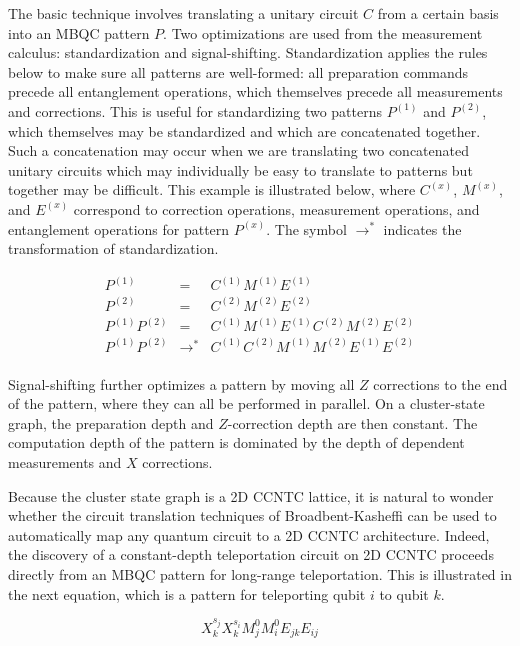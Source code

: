 \begin{description}
The basic
technique involves translating a unitary circuit $C$ from a certain basis
into an MBQC pattern $P$. Two optimizations are used from the measurement
calculus: standardization and signal-shifting. Standardization applies
the rules below to make sure all patterns are well-formed: all
preparation commands precede all entanglement operations, which themselves
precede all measurements and corrections. This is useful for
standardizing two patterns $P^(1)$ and $P^(2)$, which themselves may be
standardized and which are concatenated together. Such a concatenation
may occur when we are translating two concatenated unitary circuits
which may individually be easy to translate to patterns but together may
be difficult. This example is illustrated below, where $C^{(x)}$,
$M^{(x)}$, and $E^{(x)}$ correspond to correction operations, measurement
operations, and entanglement operations for pattern $P^{(x)}$.
The symbol $\rightarrow^{*}$ indicates the transformation of standardization.

\begin{eqnarray}
P^{(1)} & = & C^{(1)}M^{(1)}E^{(1)} \\
P^{(2)} & = & C^{(2)}M^{(2)}E^{(2)} \\
P^{(1)}P^{(2)} & = & C^{(1)}M^{(1)}E^{(1)}C^{(2)}M^{(2)}E^{(2)} \\
P^{(1)}P^{(2)} & \rightarrow^{*} & C^{(1)}C^{(2)}M^{(1)}M^{(2)}E^{(1)}E^{(2)} \\
\end{eqnarray}

Signal-shifting further optimizes a pattern by moving all $Z$ corrections to
the end of the pattern, where they can all be performed in parallel. On a
cluster-state graph, the preparation depth and $Z$-correction depth are then
constant. The computation depth of the pattern is dominated by the
depth of dependent measurements and $X$ corrections.

Because the cluster state graph is a 2D CCNTC lattice, it is natural to
wonder whether the circuit translation techniques of Broadbent-Kasheffi
can be used to automatically map any quantum circuit to a 2D CCNTC
architecture. Indeed, the discovery of a constant-depth teleportation
circuit on \textsf{2D CCNTC} proceeds directly from an MBQC pattern
for long-range teleportation. This is illustrated in the next equation,
which is a pattern for teleporting qubit $i$ to qubit $k$.

\begin{equation}
X^{s_j}_k X^{s_i}_k M^0_j M^0_i E_{jk} E_{ij}
\end{equation}


\end{description}
